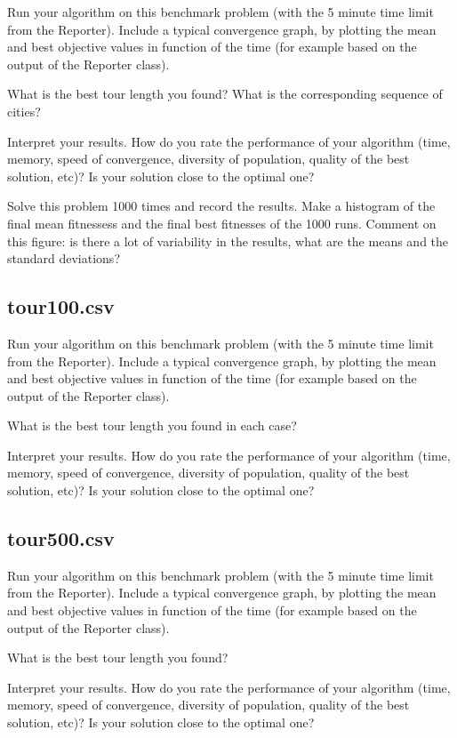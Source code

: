 \documentclass[a4paper,10pt]{article}
\newcommand{\ReplaceMe}[1]{{\color{blue}#1}}
\begin{document}
\ReplaceMe{Run your algorithm on this benchmark problem (with the 5 minute time limit from the Reporter). Include a typical convergence graph, by plotting the mean and best objective values in function of the time (for example based on the output of the Reporter class). 

What is the best tour length you found? What is the corresponding sequence of cities? 

Interpret your results. How do you rate the performance of your algorithm (time, memory, speed of convergence, diversity of population, quality of the best solution, etc)? Is your solution close to the optimal one?

Solve this problem 1000 times and record the results. Make a histogram of the final mean fitnessess and the final best fitnesses of the 1000 runs. Comment on this figure: is there a lot of variability in the results, what are the means and the standard deviations?}

\subsection{tour100.csv}

\ReplaceMe{Run your algorithm on this benchmark problem (with the 5 minute time limit from the Reporter). Include a typical convergence graph, by plotting the mean and best objective values in function of the time (for example based on the output of the Reporter class). 

What is the best tour length you found in each case? 

Interpret your results. How do you rate the performance of your algorithm (time, memory, speed of convergence, diversity of population, quality of the best solution, etc)? Is your solution close to the optimal one?}

\subsection{tour500.csv}

\ReplaceMe{Run your algorithm on this benchmark problem (with the 5 minute time limit from the Reporter). Include a typical convergence graph, by plotting the mean and best objective values in function of the time (for example based on the output of the Reporter class). 

What is the best tour length you found? 

Interpret your results. How do you rate the performance of your algorithm (time, memory, speed of convergence, diversity of population, quality of the best solution, etc)? Is your solution close to the optimal one?}
\end{document}
